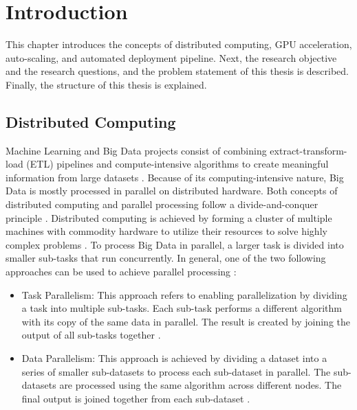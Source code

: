 \chapter{Introduction}
\label{chap:01_introduction}

This chapter introduces the concepts of distributed computing, GPU acceleration, auto-scaling, and automated deployment pipeline.
Next, the research objective and the research questions, and the problem statement of this thesis is described.
Finally, the structure of this thesis is explained.


\section{Distributed Computing}
Machine Learning and Big Data projects consist of combining extract-transform-load (ETL) pipelines and compute-intensive algorithms to create meaningful information from large datasets \cite{Vadapalli2018DevOps}.
Because of its computing-intensive nature, Big Data is mostly processed in parallel on distributed hardware.
Both concepts of distributed computing and parallel processing follow a divide-and-conquer principle \cite{Khattak2016BigData}.
Distributed computing is achieved by forming a cluster of multiple machines with commodity hardware to utilize their resources to solve highly complex problems \cite{Ganelin2016Spark}.
To process Big Data in parallel, a larger task is divided into smaller sub-tasks that run concurrently.
In general, one of the two following approaches can be used to achieve parallel processing \cite{Khattak2016BigData}:
\begin{itemize}
\item Task Parallelism:
This approach refers to enabling parallelization by dividing a task into multiple sub-tasks.
Each sub-task performs a different algorithm with its copy of the same data in parallel.
The result is created by joining the output of all sub-tasks together \cite{Khattak2016BigData}.

\item Data Parallelism:
This approach is achieved by dividing a dataset into a series of smaller sub-datasets to process each sub-dataset in parallel.
The sub-datasets are processed using the same algorithm across different nodes.
%
The final output is joined together from each sub-dataset \cite{Khattak2016BigData}.
\end{itemize}

